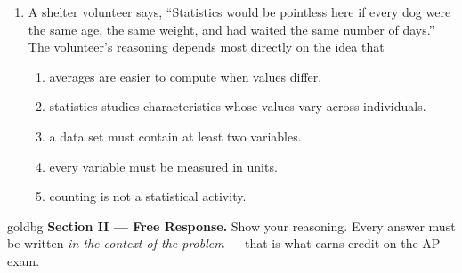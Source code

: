 \documentclass[10pt]{article}
\begin{document}
\begin{enumerate}[leftmargin=1.9em, itemsep=0.14in]
  \item A shelter volunteer says, ``Statistics would be pointless here if every dog were the
        same age, the same weight, and had waited the same number of days.'' The volunteer's
        reasoning depends most directly on the idea that
        \begin{enumerate}[label=\textbf{(\Alph*)}, leftmargin=2.2em, itemsep=3pt]
          \item averages are easier to compute when values differ.
          \item statistics studies characteristics whose values vary across individuals.
          \item a data set must contain at least two variables.
          \item every variable must be measured in units.
          \item counting is not a statistical activity.
                \hfill{}
        \end{enumerate}

\end{enumerate}

\vspace{0.14in}

\boxguard[16]
\begin{headlinebox}{goldbg}
\small
\textbf{Section II --- Free Response.} Show your reasoning. Every answer must be written
\emph{in the context of the problem} --- that is what earns credit on the AP exam.
\end{headlinebox}

\vspace{0.10in}
\end{document}

